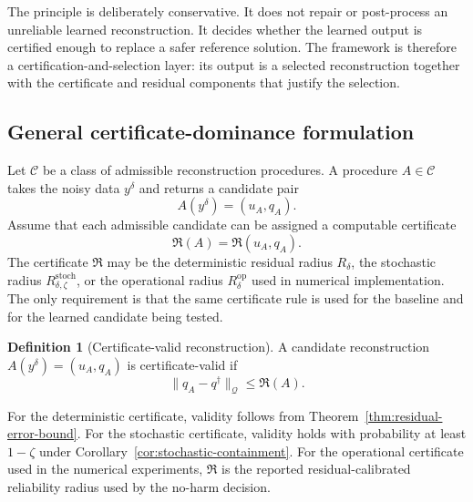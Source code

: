 \documentclass{article}
\numberwithin{equation}{section}
\theoremstyle{definition}
\newtheorem{definition}{Definition}
\begin{document}
The principle is deliberately conservative. It does not repair or post-process an unreliable learned reconstruction. It decides whether the learned output is certified enough to replace a safer reference solution. The framework is therefore a certification-and-selection layer: its output is a selected reconstruction together with the certificate and residual components that justify the selection.

\subsection{General certificate-dominance formulation}

Let \(\mathcal C\) be a class of admissible reconstruction procedures. A procedure \(A\in\mathcal C\) takes the noisy data \(y^\delta\) and returns a candidate pair
\begin{equation}
A(y^\delta)=(u_A,q_A).
\label{eq:procedure-output}
\end{equation}
Assume that each admissible candidate can be assigned a computable certificate
\begin{equation}
\mathfrak R(A)
=
\mathfrak R(u_A,q_A).
\label{eq:abstract-certificate}
\end{equation}
The certificate \(\mathfrak R\) may be the deterministic residual radius \(R_\delta\), the stochastic radius \(R_{\delta,\zeta}^{\mathrm{stoch}}\), or the operational radius \(R_\delta^{\mathrm{op}}\) used in numerical implementation. The only requirement is that the same certificate rule is used for the baseline and for the learned candidate being tested.

\begin{definition}[Certificate-valid reconstruction]
\label{def:certificate-valid-reconstruction}
A candidate reconstruction \(A(y^\delta)=(u_A,q_A)\) is certificate-valid if
\begin{equation}
\|q_A-q^\dagger\|_{\mathcal Q}
\le
\mathfrak R(A).
\label{eq:certificate-valid}
\end{equation}
\end{definition}

For the deterministic certificate, validity follows from Theorem~\ref{thm:residual-error-bound}. For the stochastic certificate, validity holds with probability at least \(1-\zeta\) under Corollary~\ref{cor:stochastic-containment}. For the operational certificate used in the numerical experiments, \(\mathfrak R\) is the reported residual-calibrated reliability radius used by the no-harm decision.
\end{document}
